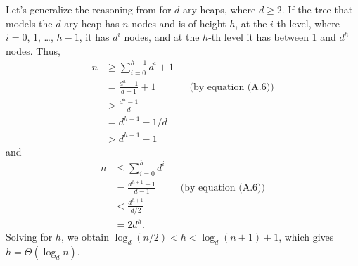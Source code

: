 Let's generalize the reasoning from  for $d$-ary heaps, where $d\ge2$.
If the tree that models the $d$-ary heap has $n$ nodes and is of height $h$, at the $i$-th level, where $i=0$, 1, \dots, $h-1$, it has $d^i$ nodes, and at the $h$-th level it has between 1 and $d^h$ nodes.
Thus,
\begin{align*}
    n &\ge \sum_{i=0}^{h-1}d^i+1 \\[1mm]
    &= \frac{d^h-1}{d-1}+1 && \text{(by equation (A.6))} \\[1mm]
    &> \frac{d^h-1}{d} \\[1mm]
    &= d^{h-1}-1/d \\
    &> d^{h-1}-1
\end{align*}
and
\begin{align*}
    n &\le \sum_{i=0}^hd^i \\[1mm]
    &= \frac{d^{h+1}-1}{d-1} && \text{(by equation (A.6))} \\[1mm]
    &< \frac{d^{h+1}}{d/2} \\[1mm]
    &= 2d^h.
\end{align*}
Solving for $h$, we obtain $\log_d(n/2)<h<\log_d(n+1)+1$, which gives $h=\Theta(\log_dn)$.
